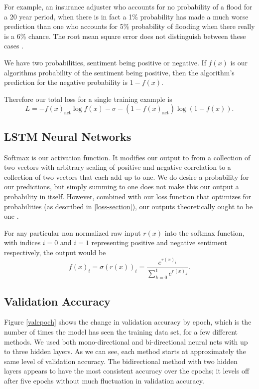 \documentclass[titlepage,letterpaper]{article}
\begin{document}
For example, an insurance adjuster who accounts for no probability of a flood for a 20 year period, when there is in fact a 1\% probability has made a much worse prediction than one who accounts for 5\% probability of flooding when there really is a 6\% chance. The root mean square error does not distinguish between these cases \cite{NeuralNet}.

We have two probabilities, sentiment being positive or negative. If \(f(x)\) is our algorithms probability of the sentiment being positive, then the algorithm's prediction for the negative probability is \(1-f(x)\).

Therefore our total loss for a single training example is
\[L = - f(x)_\text{act} \log f(x) -\sigma -(1-f(x)_\text{act}) \log (1-f(x)).\]

\subsection{LSTM Neural Networks} \label{lstm_sec}

Softmax is our activation function. It modifies our output to from a collection of two vectors  with arbitrary scaling of positive and negative correlation to a collection of two vectors that each add up to one. We do desire a probability for our predictions, but simply summing to one does not make this our output a probability in itself. However, combined with our loss function that optimizes for probabilities (as described in \cref{loss-section}), our outputs theoretically ought to  be one \cite{NeuralNet,tensorflow}.

For any particular non normalized raw input \(r(x)\)  into the softmax function, with indices \(i=0\)  and \(i=1\) representing positive and negative sentiment respectively, the output would be \cite{NeuralNet}
\[f(x)_i = \sigma(r(x))_i  = \frac{e^{r(x)_i}}{\sum_{k=0}^1 e^{r (x)_k}}.\]

\subsection{Validation Accuracy}
Figure \ref{valepoch} shows the change in validation accuracy by epoch, which is the number of times the model has seen the training data set, for a few different methods. We used both mono-directional and bi-directional neural nets with up to three hidden layers. As we can see, each method starts at approximately the same level of validation accuracy. The bidirectional method with two hidden layers appears to have the most consistent accuracy over the epochs; it levels off after five epochs without much fluctuation in validation accuracy. 
\end{document}

